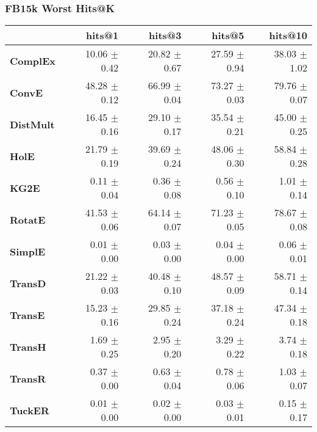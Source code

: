 \documentclass{article}
\begin{document}
\subsubsection{FB15k Worst Hits@K}
    \begin{center}
    \begin{tabular}{lrrrr}
\toprule
{} &        hits@1 &        hits@3 &        hits@5 &       hits@10 \\
\midrule
\textbf{ComplEx } &  10.06 $\pm$ 0.42 &  20.82 $\pm$ 0.67 &  27.59 $\pm$ 0.94 &  38.03 $\pm$ 1.02 \\
\textbf{ConvE   } &  48.28 $\pm$ 0.12 &  66.99 $\pm$ 0.04 &  73.27 $\pm$ 0.03 &  79.76 $\pm$ 0.07 \\
\textbf{DistMult} &  16.45 $\pm$ 0.16 &  29.10 $\pm$ 0.17 &  35.54 $\pm$ 0.21 &  45.00 $\pm$ 0.25 \\
\textbf{HolE    } &  21.79 $\pm$ 0.19 &  39.69 $\pm$ 0.24 &  48.06 $\pm$ 0.30 &  58.84 $\pm$ 0.28 \\
\textbf{KG2E    } &  $\phantom{5}$0.11 $\pm$ 0.04 &  $\phantom{5}$0.36 $\pm$ 0.08 &  $\phantom{5}$0.56 $\pm$ 0.10 &  $\phantom{5}$1.01 $\pm$ 0.14 \\
\textbf{RotatE  } &  41.53 $\pm$ 0.06 &  64.14 $\pm$ 0.07 &  71.23 $\pm$ 0.05 &  78.67 $\pm$ 0.08 \\
\textbf{SimplE  } &  $\phantom{5}$0.01 $\pm$ 0.00 &  $\phantom{5}$0.03 $\pm$ 0.00 &  $\phantom{5}$0.04 $\pm$ 0.00 &  $\phantom{5}$0.06 $\pm$ 0.01 \\
\textbf{TransD  } &  21.22 $\pm$ 0.03 &  40.48 $\pm$ 0.10 &  48.57 $\pm$ 0.09 &  58.71 $\pm$ 0.14 \\
\textbf{TransE  } &  15.23 $\pm$ 0.16 &  29.85 $\pm$ 0.24 &  37.18 $\pm$ 0.24 &  47.34 $\pm$ 0.18 \\
\textbf{TransH  } &  $\phantom{5}$1.69 $\pm$ 0.25 &  $\phantom{5}$2.95 $\pm$ 0.20 &  $\phantom{5}$3.29 $\pm$ 0.22 &  $\phantom{5}$3.74 $\pm$ 0.18 \\
\textbf{TransR  } &  $\phantom{5}$0.37 $\pm$ 0.00 &  $\phantom{5}$0.63 $\pm$ 0.04 &  $\phantom{5}$0.78 $\pm$ 0.06 &  $\phantom{5}$1.03 $\pm$ 0.07 \\
\textbf{TuckER  } &  $\phantom{5}$0.01 $\pm$ 0.00 &  $\phantom{5}$0.02 $\pm$ 0.00 &  $\phantom{5}$0.03 $\pm$ 0.01 &  $\phantom{5}$0.15 $\pm$ 0.17 \\
\bottomrule
\end{tabular}

    \end{center}
\end{document}
